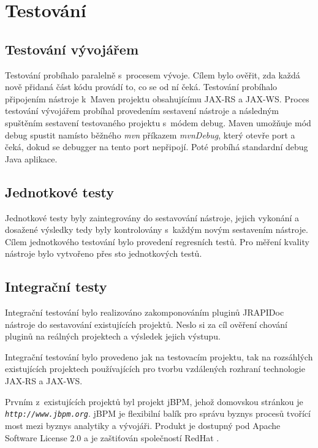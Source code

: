 \documentclass[11pt,twoside,a4paper]{book}
\begin{document}
\chapter{Testování}

\section{Testování vývojářem}

Testování probíhalo paralelně s~procesem vývoje. Cílem bylo ověřit, zda každá
nově přidaná část kódu provádí to, co se od ní čeká. Testování probíhalo
připojením nástroje k~Maven projektu obsahujícímu JAX-RS a JAX-WS. Proces
testování vývojářem probíhal provedením sestavení nástroje a následným spuštěním
sestavení testovaného projektu s~módem debug. Maven umožňuje mód debug spustit
namísto běžného {\em mvn} příkazem {\em mvnDebug}, který otevře port a čeká,
dokud se debugger na tento port nepřipojí. Poté probíhá standardní debug Java
aplikace.

\section{Jednotkové testy}

Jednotkové testy byly zaintegrovány do sestavování nástroje, jejich vykonání a
dosažené výsledky tedy byly kontrolovány s~každým novým sestavením nástroje.
Cílem jednotkového testování bylo provedení regresních testů. Pro měření kvality
nástroje bylo vytvořeno přes sto jednotkových testů.

\section{Integrační testy}

Integrační testování bylo realizováno zakomponováním pluginů JRAPIDoc nástroje
do sestavování existujících projektů. Neslo si za cíl ověření chování pluginů na
reálných projektech a výsledek jejich výstupu.

Integrační testování bylo provedeno jak na testovacím projektu, tak na
rozsáhlých existujících projektech používajících pro tvorbu vzdálených rozhraní
technologie JAX-RS a JAX-WS.

Prvním z~existujících projektů byl projekt jBPM, jehož domovskou stránkou je
{\em \nolinkurl{http://www.jbpm.org}}.
jBPM je flexibilní balík pro správu byznys procesů tvořící most mezi byznys
analytiky a vývojáři. Produkt je dostupný pod Apache Software License 2.0 a je
zaštiťován společností RedHat \cite{RedHatHome}.
\end{document}
